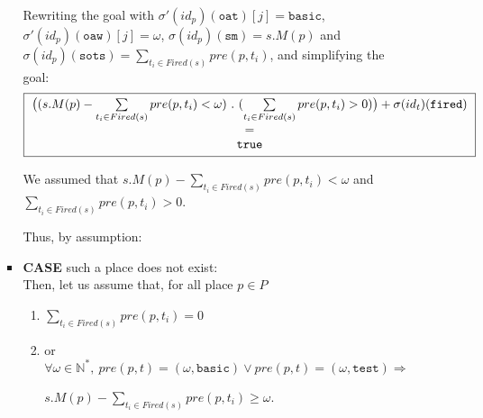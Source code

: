 \documentclass[dvipsnames,12pt]{article}
\begin{document}
\begin{niproof}
\begin{itemize}
\begin{itemize}
\begin{itemize}
        \noindent{}Rewriting the goal with
        $\sigma'(id_p)(\texttt{oat})[j]=\mathtt{basic}$,
        $\sigma'(id_p)(\texttt{oaw})[j]=\omega$, $\sigma(id_p)(\texttt{sm})=s.M(p)$
        and
        $\sigma(id_p)(\texttt{sots})=\sum\limits_{t_i\in{}Fired(s)}pre(p,t_i)$,
        and simplifying the goal:
        \begin{equation*}
          \fbox{
            \begin{tabular}{@{}c@{}}
              $\big((s.M(p)-\sum\limits_{t_i\in{}Fired(s)}pre(p,t_i)<\omega)~.~(\sum\limits_{t_i\in{}Fired(s)}pre(p,t_i)>0)\big)+\sigma(id_t)(\texttt{fired})$ \\
              $=$\\
              $\mathtt{true}$\\
            \end{tabular}
          }
        \end{equation*}

        We assumed that
        $s.M(p)-\sum\limits_{t_i\in{}Fired(s)}pre(p,t_i)<\omega$ and
        $\sum\limits_{t_i\in{}Fired(s)}pre(p,t_i)>0$.

        Thus, by assumption: \\
        
      \item \textbf{CASE} such a place does not exist:\\
        Then, let us assume that, for all place $p\in{}P$
        \begin{enumerate}
        \item $\sum\limits_{t_i\in{}Fired(s)}pre(p,t_i)=0$\label{item:4}
        \item or
          $\forall{}\omega\in\mathbb{N}^{*},~pre(p,t)=(\omega,\mathtt{basic})\lor{}pre(p,t)=(\omega,\mathtt{test})
          \Rightarrow{}$
          
          \hspace{3ex}$s.M(p)-\sum\limits_{t_i\in{}Fired(s)}pre(p,t_i)\ge\omega$.\label{item:5}
        \end{enumerate}
        

\end{itemize}
\end{itemize}
\end{itemize}
\end{niproof}
\end{document}
